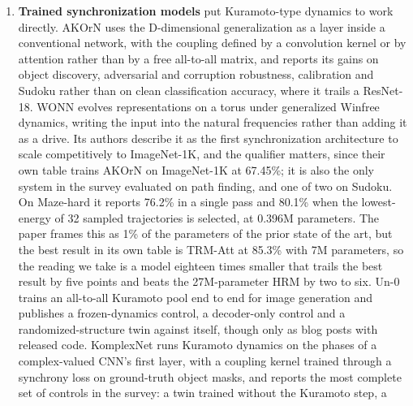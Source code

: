 \documentclass[a4paper,fleqn]{cas-sc}
\begin{document}
\begin{enumerate}
  the same \ensuremath{\alpha} the oscillation frequency and states that
  the system has no damping or friction term; \ensuremath{\alpha}
  multiplies the position, enters the Hamiltonian as the restoring
  potential, and cannot dissipate energy, so we read the model as the
  undamped one its name declares. And the LinOSS paper never uses the
  word damping, while D-LinOSS describes its predecessors as undamped
  harmonic oscillators whose discretization couples frequency and
  damping: the dissipation in question belongs to the implicit
  integrator, not to a term of the model.
\item
  \textbf{Trained synchronization models} put Kuramoto-type dynamics to
  work directly. AKOrN \citep{akorn} uses the D-dimensional
  generalization as a layer inside a conventional network, with the
  coupling defined by a convolution kernel or by attention rather than
  by a free all-to-all matrix, and reports its gains on object
  discovery, adversarial and corruption robustness, calibration and
  Sudoku rather than on clean classification accuracy, where it trails a
  ResNet-18. WONN \citep{wonn} evolves representations on a torus under
  generalized Winfree dynamics, writing the input into the natural
  frequencies rather than adding it as a drive. Its authors describe it
  as the first synchronization architecture to scale competitively to
  ImageNet-1K, and the qualifier matters, since their own table trains
  AKOrN on ImageNet-1K at 67.45\%; it is also the only system in the
  survey evaluated on path finding, and one of two on Sudoku. On
  Maze-hard it reports 76.2\% in a single pass and 80.1\% when the
  lowest-energy of 32 sampled trajectories is selected, at 0.396M
  parameters. The paper frames this as 1\% of the parameters of the
  prior state of the art, but the best result in its own table is
  TRM-Att at 85.3\% with 7M parameters, so the reading we take is a
  model eighteen times smaller that trails the best result by five
  points and beats the 27M-parameter HRM by two to six. Un-0
  \citep{un-0} trains an all-to-all Kuramoto pool end to end for image
  generation and publishes a frozen-dynamics control, a decoder-only
  control and a randomized-structure twin against itself, though only as
  blog posts with released code. KomplexNet \citep{muzellec2025} runs
  Kuramoto dynamics on the phases of a complex-valued CNN's first layer,
  with a coupling kernel trained through a synchrony loss on
  ground-truth object masks, and reports the most complete set of
  controls in the survey: a twin trained without the Kuramoto step, a

\end{enumerate}
\end{document}
